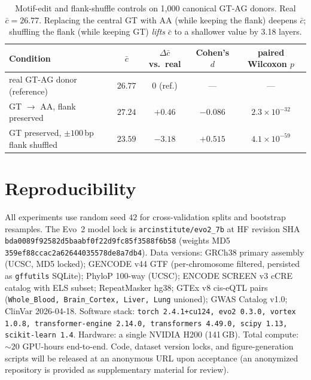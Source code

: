 \documentclass{article}
\theoremstyle{plain}
\theoremstyle{definition}
\theoremstyle{remark}
\begin{document}
\begin{table}[!htbp]
  \caption{Motif-edit and flank-shuffle controls on 1{,}000 canonical
    GT-AG donors. Real $\bar c\!=\!26.77$. Replacing the central GT with AA
    (while keeping the flank) deepens $\bar c$; shuffling the flank
  (while keeping GT) \emph{lifts} $\bar c$ to a shallower value by 3.18 layers.}
  \label{tab:motif-flank}
  \centering
  \small
  \begin{tabular}{@{}lcccc@{}}
    \toprule
    Condition & $\bar c$ & $\Delta \bar c$ vs.\ real & Cohen's $d$ & paired Wilcoxon $p$ \\
    \midrule
    real GT-AG donor (reference)             & $26.77$ & $0$ (ref.)   & ---     & --- \\
    GT $\to$ AA, flank preserved             & $27.24$ & $+0.46$      & $-0.086$ & $2.3\!\times\!10^{-32}$ \\
    GT preserved, $\pm 100$\,bp flank shuffled & $23.59$ & $\mathbf{-3.18}$ & $\mathbf{+0.515}$ & $4.1\!\times\!10^{-59}$ \\
    \bottomrule
  \end{tabular}
\end{table}

\section{Reproducibility}
\label{app:repro}

All experiments use random seed $42$ for cross-validation splits and
bootstrap resamples. The Evo~2 model lock is
\texttt{arcinstitute/evo2\_7b} at HF revision SHA
\texttt{bda0089f92582d5baabf0f22d9fc85f3588f6b58} (weights MD5
\texttt{359ef88ccac2a62644035578de8a7db4}). Data versions:
GRCh38 primary assembly (UCSC, MD5 locked); GENCODE v44 GTF
(per-chromosome filtered, persisted as \texttt{gffutils} SQLite);
PhyloP 100-way (UCSC); ENCODE SCREEN v3 cCRE catalog with ELS subset;
RepeatMasker hg38; GTEx v8 cis-eQTL pairs (\texttt{Whole\_Blood,
Brain\_Cortex, Liver, Lung} unioned); GWAS Catalog v1.0; ClinVar
2026-04-18. Software stack: \texttt{torch 2.4.1+cu124, evo2 0.3.0,
  vortex 1.0.8, transformer-engine 2.14.0, transformers 4.49.0, scipy
1.13, scikit-learn 1.4}. Hardware: a single NVIDIA H200 (141\,GB).
Total compute: $\sim 20$ GPU-hours end-to-end. Code, dataset version
locks, and figure-generation scripts will be released at an anonymous
URL upon acceptance (an anonymized repository is provided as
supplementary material for review).
\end{document}
